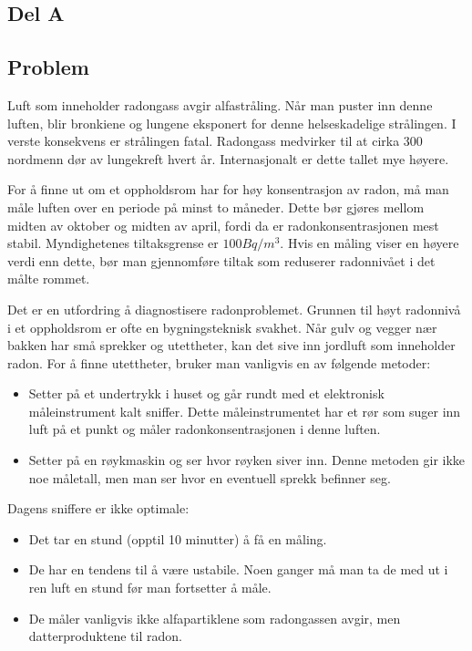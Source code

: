 \subsection{Del A}

\subsection{Problem}

Luft som inneholder radongass avgir alfastråling. Når man puster inn denne luften, blir bronkiene og lungene eksponert for denne helseskadelige strålingen. I verste konsekvens er strålingen fatal. Radongass medvirker til at cirka 300 nordmenn dør av lungekreft hvert år. Internasjonalt er dette tallet mye høyere.

For å finne ut om et oppholdsrom har for høy konsentrasjon av radon, må man måle luften over en periode på minst to måneder. Dette bør gjøres mellom midten av oktober og midten av april, fordi da er radonkonsentrasjonen mest stabil. Myndighetenes tiltaksgrense er $100 Bq/m^3$. Hvis en måling viser en høyere verdi enn dette, bør man gjennomføre tiltak som reduserer radonnivået i det målte rommet.

Det er en utfordring å diagnostisere radonproblemet. Grunnen til høyt radonnivå i et oppholdsrom er ofte en bygningsteknisk svakhet. Når gulv og vegger nær bakken har små sprekker og utettheter, kan det sive inn jordluft som inneholder radon. For å finne utettheter, bruker man vanligvis en av følgende metoder:
\begin{itemize}
	\item Setter på et undertrykk i huset og går rundt med et elektronisk måleinstrument kalt sniffer. Dette måleinstrumentet har et rør som suger inn luft på et punkt og måler radonkonsentrasjonen i denne luften.
	\item Setter på en røykmaskin og ser hvor røyken siver inn. Denne metoden gir ikke noe måletall, men man ser hvor en eventuell sprekk befinner seg.
\end{itemize}

Dagens sniffere er ikke optimale:
\begin{itemize}
	\item Det tar en stund (opptil 10 minutter) å få en måling.
	\item De har en tendens til å være ustabile. Noen ganger må man ta de med ut i ren luft en stund før man fortsetter å måle.
	\item De måler vanligvis ikke alfapartiklene som radongassen avgir, men datterproduktene til radon.
\end{itemize}

